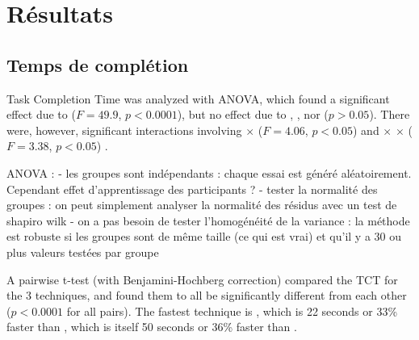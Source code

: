 \section{Résultats}
\label{sec:experiment_results}

\subsection{Temps de complétion}
\label{subsec:experiment_results_time}
Task Completion Time was analyzed with ANOVA, which found a significant effect due to  ($F=49.9$, $p < 0.0001$), but no effect due to , , nor  ($p > 0.05$). There were, however, significant interactions involving  $\times$  ($F=4.06$, $p < 0.05$) and  $\times$  $\times$  ($F=3.38$, $p < 0.05$) .

ANOVA :
- les groupes sont indépendants : chaque essai est généré aléatoirement. Cependant effet d'apprentissage des participants ?
- tester la normalité des groupes : on peut simplement analyser la normalité des résidus avec un test de shapiro wilk
- on a pas besoin de tester l'homogénéité de la variance : la méthode est robuste si les groupes sont de même taille (ce qui est vrai) et qu'il y a 30 ou plus valeurs testées par groupe



A pairwise t-test (with Benjamini-Hochberg correction) compared the TCT for the 3 techniques, and found them to all be significantly different from each other ($p < 0.0001$ for all pairs). The fastest technique is , which is 22 seconds or 33\% faster than , which is itself 50 seconds or 36\% faster than .

